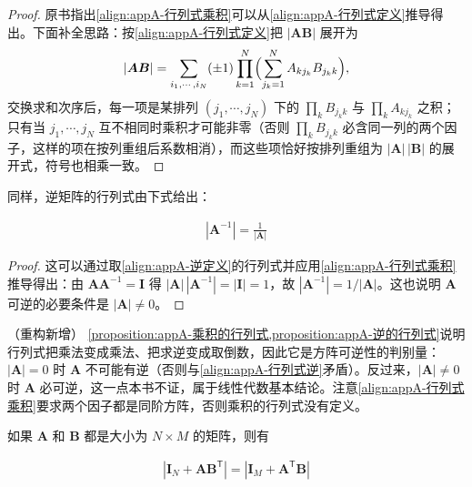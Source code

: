 \documentclass[../main.tex]{subfiles}
\begin{document}
\begin{proof}
原书指出\eqref{align:appA-行列式乘积}可以从\eqref{align:appA-行列式定义}推导得出。下面补全思路：按\eqref{align:appA-行列式定义}把 $|\bm{A}\bm{B}|$ 展开为
\begin{align*}
  |\bm{A}\bm{B}|=\sum_{i_1,\cdots,i_N}(\pm1)\prod_{k=1}^{N}\Bigl(\sum_{j_k=1}^{N}A_{kj_k}B_{j_kk}\Bigr),
\end{align*}
交换求和次序后，每一项是某排列 $(j_1,\cdots,j_N)$ 下的 $\prod_k B_{j_kk}$ 与 $\prod_k A_{kj_k}$ 之积；只有当 $j_1,\cdots,j_N$ 互不相同时乘积才可能非零（否则 $\prod_k B_{j_kk}$ 必含同一列的两个因子，这样的项在按列重组后系数相消），而这些项恰好按排列重组为 $|\bm{A}|\,|\bm{B}|$ 的展开式，符号也相乘一致。
\end{proof}

同样，逆矩阵的行列式由下式给出：
\begin{proposition}[逆矩阵的行列式]\label{proposition:appA-逆的行列式}
\begin{align}
  |\bm{A}^{-1}|=\frac{1}{|\bm{A}|}
  \label{align:appA-行列式逆}
\end{align}
\end{proposition}

\begin{proof}
这可以通过取\eqref{align:appA-逆定义}的行列式并应用\eqref{align:appA-行列式乘积}推导得出：由 $\bm{A}\bm{A}^{-1}=\bm{I}$ 得 $|\bm{A}|\,|\bm{A}^{-1}|=|\bm{I}|=1$，故 $|\bm{A}^{-1}|=1/|\bm{A}|$。这也说明 $\bm{A}$ 可逆的必要条件是 $|\bm{A}|\neq0$。
\end{proof}

\begin{remark}（重构新增）
\cref{proposition:appA-乘积的行列式,proposition:appA-逆的行列式}说明行列式把乘法变成乘法、把求逆变成取倒数，因此它是方阵可逆性的判别量：$|\bm{A}|=0$ 时 $\bm{A}$ 不可能有逆（否则与\eqref{align:appA-行列式逆}矛盾）。反过来，$|\bm{A}|\neq0$ 时 $\bm{A}$ 必可逆，这一点本书不证，属于线性代数基本结论。注意\eqref{align:appA-行列式乘积}要求两个因子都是同阶方阵，否则乘积的行列式没有定义。
\end{remark}

如果 $\bm{A}$ 和 $\bm{B}$ 都是大小为 $N\times M$ 的矩阵，则有
\begin{proposition}\label{proposition:appA-sylvester}
\begin{align}
  |\bm{I}_N+\bm{A}\bm{B}^{\mathsf{T}}|=|\bm{I}_M+\bm{A}^{\mathsf{T}}\bm{B}|
  \label{align:appA-sylvester行列式}
\end{align}
\end{proposition}
\end{document}
